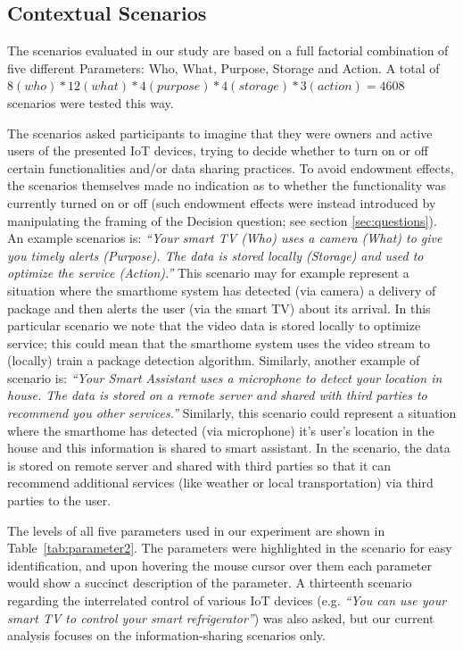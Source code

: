 \subsection{Contextual Scenarios}
The scenarios evaluated in our study are based on a full factorial combination of five different Parameters: Who, What, Purpose, Storage and Action. A total of $8(who)*12(what)*4(purpose)*4(storage)*3(action) = 4608$ scenarios were tested this way. 

The scenarios asked participants to imagine that they were owners and active users of the presented IoT devices, trying to decide whether to turn on or off certain functionalities and/or data sharing practices. To avoid endowment effects, the scenarios themselves made no indication as to whether the functionality was currently turned on or off (such endowment effects were instead introduced by manipulating the framing of the Decision question; see section \ref{sec:questions}). An example scenarios is: \emph{``Your smart TV (Who) uses a camera (What) to give you timely alerts (Purpose). The data is stored locally (Storage) and used to optimize the service (Action).''} This scenario may for example represent a situation where the smarthome system has detected (via camera) a delivery of package and then alerts the user (via the smart TV) about its arrival. In this particular scenario we note that the video data is stored locally to optimize service; this could mean that the smarthome system uses the video stream to (locally) train a package detection algorithm. Similarly, another example of scenario is: \emph{``Your Smart Assistant uses a microphone to detect your location in house. The data is stored on a remote server and shared with third parties to recommend you other services.''} Similarly, this scenario could represent a situation where the smarthome has detected (via microphone) it's user's location in the house and this information is shared to smart assistant. In the scenario, the data is stored on remote server and shared with third parties so that it can recommend additional services (like weather or local transportation) via third parties to the user.

The levels of all five parameters used in our experiment are shown in Table~\ref{tab:parameter2}. The parameters were highlighted in the scenario for easy identification, and upon hovering the mouse cursor over them each parameter would show a succinct description of the parameter. %
A thirteenth scenario regarding the interrelated control of various IoT devices (e.g. \emph{``You can use your smart TV to control your smart refrigerator''}) was also asked, but our current analysis focuses on the information-sharing scenarios only.

